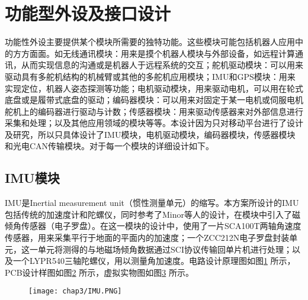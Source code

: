 \section{功能型外设及接口设计}
功能性外设主要提供某个模块所需要的独特功能。这些模块可能包括机器人应用中的方方面面。如无线通讯模块：用来是摸个机器人模块与外部设备，如远程计算通讯，从而实现信息的沟通或是机器人于远程系统的交互；舵机驱动模块：可以用来驱动具有多舵机结构的机械臂或其他的多舵机应用模块；IMU和GPS模块：用来实现定位，机器人姿态探测等功能；电机驱动模块，用来驱动电机，可以用在轮式底盘或是履带式底盘的驱动；编码器模块：可以用来对固定于某一电机或伺服电机舵机上的编码器进行驱动与计数；传感器模块：用来驱动传感器来对外部信息进行采集和处理；以及其他应用领域的模块等等。本设计因为只对移动平台进行了设计及研究，所以只具体设计了IMU模块，电机驱动模块，编码器模块，传感器模块和光电CAN传输模块。对于每一个模块的详细设计如下。

\subsection{IMU模块}
IMU是Inertial measurement unit（惯性测量单元）的缩写。本方案所设计的IMU包括传统的加速度计和陀螺仪，同时参考了Minor等人的设计，在模块中引入了磁倾角传感器（电子罗盘）。在这一模块的设计中，使用了一片SCA100T两轴角速度传感器，用来采集平行于地面的平面内的加速度；一个ZCC212N电子罗盘封装单元，这一单元将测得的与地磁场倾角数据通过SCI协议传输回单片机进行处理；以及一个LYPR540三轴陀螺仪，用以测量角加速度。电路设计原理图如图\ref{fig.IMUSch} 所示，PCB设计样图如图\ref{fig.IMUPCB} 所示，虚拟实物图如图\ref{fig.IMUReal} 所示。 
\begin{figure}[!htp]\label{fig.IMUSch}
  \centering
  \texttt{[image: chap3/IMU.PNG]}
\end{figure}
\begin{figure}\label{fig.IMUPCB}
  \centering
  \hspace{1in}
\end{figure}
\begin{figure}\label{fig.IMUReal}
  \centering
  \hspace{1in}
\end{figure}

